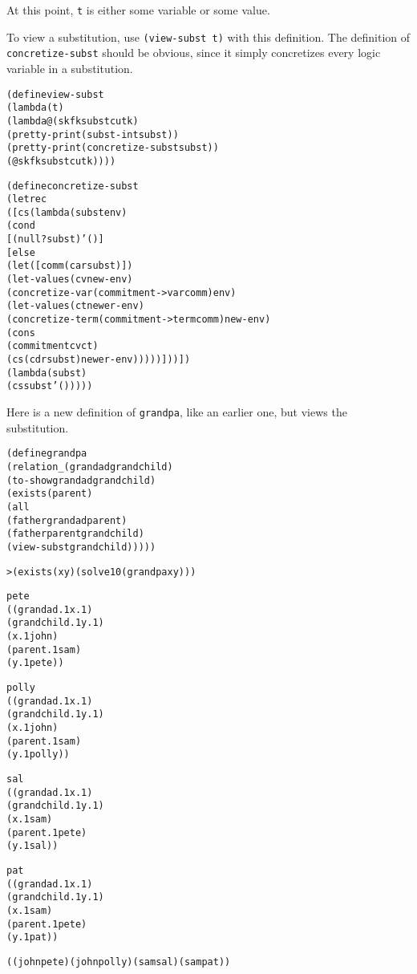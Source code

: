 \noindent
At this point, \texttt{t} is either some variable or some value.  

To view a substitution, use \texttt{(view-subst t)} with this
definition.  The definition of \texttt{concretize-subst} should
be obvious, since it simply concretizes every logic variable in
a substitution.  

\begin{alltt}
(define view-subst
  (lambda (t)
    (lambda@ (sk fk subst cutk)
      (pretty-print (subst-in t subst))
      (pretty-print (concretize-subst subst))
      (@ sk fk subst cutk))))

(define concretize-subst
  (letrec
    ([cs (lambda (subst env)
           (cond
             [(null? subst) '()]
             [else
               (let ([comm (car subst)])
                 (let-values (cv new-env)
                   (concretize-var (commitment->var comm) env)
                   (let-values (ct newer-env)
                     (concretize-term (commitment->term comm) new-env)
                     (cons
                       (commitment cv ct)
                       (cs (cdr subst) newer-env)))))]))])
    (lambda (subst)
      (cs subst '()))))
\end{alltt}

Here is a new definition of \texttt{grandpa}, like an earlier one,
but views the substitution.

\begin{alltt}
(define grandpa
  (relation _ (grandad grandchild)
    (to-show grandad grandchild)
    (exists (parent)
      (all
        (father grandad parent)
        (father parent grandchild)
        (view-subst grandchild)))))
\end{alltt}

\begin{alltt}
> (exists (x y) (solve 10 (grandpa x y)))

pete
((grandad.1 x.1)
 (grandchild.1 y.1)
 (x.1 john)
 (parent.1 sam)
 (y.1 pete))

polly
((grandad.1 x.1)
 (grandchild.1 y.1)
 (x.1 john)
 (parent.1 sam)
 (y.1 polly))
\end{alltt}
\newpage
\begin{alltt}
sal
((grandad.1 x.1)
 (grandchild.1 y.1)
 (x.1 sam)
 (parent.1 pete)
 (y.1 sal))

pat
((grandad.1 x.1)
 (grandchild.1 y.1)
 (x.1 sam)
 (parent.1 pete)
 (y.1 pat))

((john pete) (john polly) (sam sal) (sam pat))
\end{alltt}

